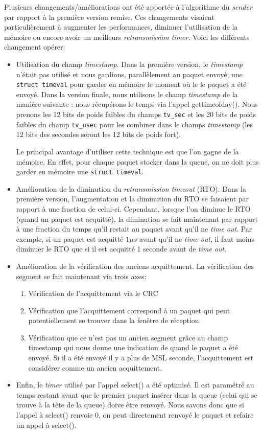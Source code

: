 \documentclass[12pt,notitlepage]{report}
\newcommand{\pkg}[1]{\texttt{#1}}
\newcommand{\op}[1]{\textsf{#1}}
\begin{document}
\begin{appendices}
	Plusieurs changements/améliorations ont été apportée à l'algorithme du \textit{sender} par rapport à la première version remise. Ces changements visaient particulièrement à augmenter les performances, diminuer l'utilisation de la mémoire ou encore avoir un meilleurs \textit{retransmission timer}. Voici les différents changement opérer:
	\begin{itemize}
		\item Utilisation du champ \textit{timestamp}. Dans la première version, le \textit{timestamp} n'était pas utilisé et nous gardions, parallèlement au paquet envoyé, une \pkg{struct timeval} pour garder en mémoire le moment où le le paquet a été envoyé. Dans la version finale, nous utilisons le champ \textit{timestamp} de la manière suivante : nous récupérons le temps via l'appel \op{gettimeofday()}. Nous prenons les 12 bits de poids faibles du champs \pkg{tv\_sec} et les 20 bits de poids faibles du champ \pkg{tv\_usec} pour les combiner dans le champs \textit{timestamp} (les 12 bits des secondes seront les 12 bits de poids fort).
		
		Le principal avantage d'utiliser cette technique est que l'on gagne de la mémoire. En effet, pour chaque paquet stocker dans la queue, on ne doit plus garder en mémoire une \pkg{struct timeval}.
		
		\item Amélioration de la diminution du \textit{retransmission timeout} (RTO). Dans la première version, l'augmentation et la diminution du RTO se faisaient par rapport à une fraction de celui-ci. Cependant, lorsque l'on diminue le RTO (quand un paquet est acquitté), la diminution se fait maintenant par rapport à une fraction du temps qu'il restait au paquet avant qu'il ne \textit{time out}. Par exemple, si un paquet est acquitté $1\mu s$ avant qu'il ne \textit{time out}, il faut moins diminuer le RTO que si il est acquitté 1 seconde avant de \textit{time out}.
		
		\item Amélioration de la vérification des anciens acquittement. La vérification des segment se fait maintenant via trois axes:
			\begin{enumerate}
				\item Vérification de l'acquittement via le CRC
				\item Vérification que l'acquittement correspond à un paquet qui peut potentiellement se trouver dans la fenêtre de réception.
				\item Vérification que ce n'est pas un ancien segment grâce au champ timestamp qui nous donne une indication de quand le paquet a été envoyé. Si il a été envoyé il y a plus de MSL seconde, l'acquittement est considérer comme un ancien acquittement.
			\end{enumerate}
		\item Enfin, le \textit{timer} utilisé par l'appel \op{select()} a été optimisé. Il est paramétré au temps restant avant que le premier paquet insérer dans la queue (celui qui se trouve à la tête de la queue) doive être renvoyé. Nous savons donc que si l'appel à \op{select()} renvoie 0, on peut directement renvoyé le paquet et refaire un appel à \op{select()}.
	\end{itemize}
\end{appendices}
\end{document}
